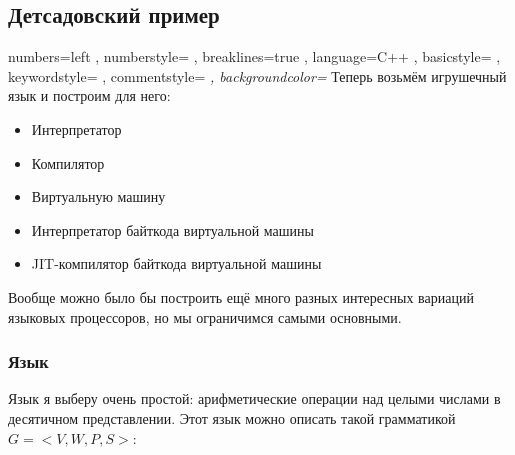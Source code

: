 \documentclass[11pt]{book}
\begin{document}
\subsection{Детсадовский пример}
    { numbers=left
    , numberstyle=\footnotesize\ttfamily\color{cblue3}
    , breaklines=true
    , language=C++
    , basicstyle=\footnotesize\ttfamily\color{cblue1}
    , keywordstyle=\footnotesize\ttfamily\color{cblue2}
    , commentstyle=\itshape\color{cgreen}
    , backgroundcolor=\color{cgray}
    }
\lstset{style=cxx}
Теперь возьмём игрушечный язык и построим для него:
\begin{itemize}
\item Интерпретатор
\item Компилятор
\item Виртуальную машину
\item Интерпретатор байткода виртуальной машины
\item JIT-компилятор байткода виртуальной машины
\end{itemize}
Вообще можно было бы построить ещё много разных интересных вариаций языковых процессоров,
но мы ограничимся самыми основными.

\subsubsection{Язык}
Язык я выберу очень простой: арифметические операции над целыми числами
в десятичном представлении. Этот язык можно описать такой грамматикой $G=<V,W,P,S>$:
\end{document}
